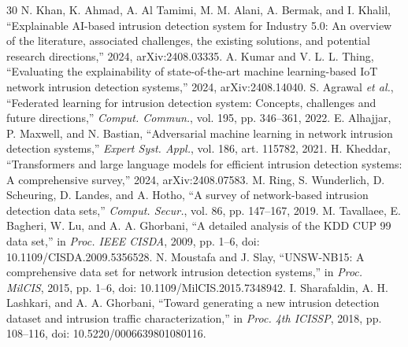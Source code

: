 \documentclass[conference]{IEEEtran}
\begin{document}
\begin{thebibliography}{30}
 N. Khan, K. Ahmad, A. Al Tamimi, M. M. Alani, A. Bermak, and I. Khalil, ``Explainable AI-based intrusion detection system for Industry 5.0: An overview of the literature, associated challenges, the existing solutions, and potential research directions,'' 2024, arXiv:2408.03335.
 A. Kumar and V. L. L. Thing, ``Evaluating the explainability of state-of-the-art machine learning-based IoT network intrusion detection systems,'' 2024, arXiv:2408.14040.
 S. Agrawal \textit{et al.}, ``Federated learning for intrusion detection system: Concepts, challenges and future directions,'' \textit{Comput. Commun.}, vol. 195, pp. 346--361, 2022.
 E. Alhajjar, P. Maxwell, and N. Bastian, ``Adversarial machine learning in network intrusion detection systems,'' \textit{Expert Syst. Appl.}, vol. 186, art. 115782, 2021.
 H. Kheddar, ``Transformers and large language models for efficient intrusion detection systems: A comprehensive survey,'' 2024, arXiv:2408.07583.
 M. Ring, S. Wunderlich, D. Scheuring, D. Landes, and A. Hotho, ``A survey of network-based intrusion detection data sets,'' \textit{Comput. Secur.}, vol. 86, pp. 147--167, 2019.
 M. Tavallaee, E. Bagheri, W. Lu, and A. A. Ghorbani, ``A detailed analysis of the KDD CUP 99 data set,'' in \textit{Proc. IEEE CISDA}, 2009, pp. 1--6, doi: 10.1109/CISDA.2009.5356528.
 N. Moustafa and J. Slay, ``UNSW-NB15: A comprehensive data set for network intrusion detection systems,'' in \textit{Proc. MilCIS}, 2015, pp. 1--6, doi: 10.1109/MilCIS.2015.7348942.
 I. Sharafaldin, A. H. Lashkari, and A. A. Ghorbani, ``Toward generating a new intrusion detection dataset and intrusion traffic characterization,'' in \textit{Proc. 4th ICISSP}, 2018, pp. 108--116, doi: 10.5220/0006639801080116.
\end{thebibliography}
\end{document}
